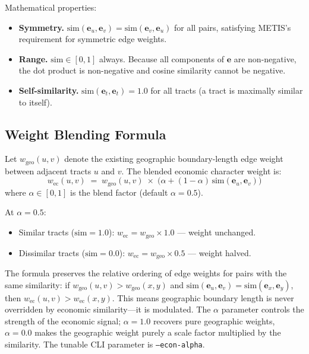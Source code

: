 Mathematical properties:
\begin{itemize}
  \item \textbf{Symmetry.} $\mathrm{sim}(\mathbf{e}_u, \mathbf{e}_v)
    = \mathrm{sim}(\mathbf{e}_v, \mathbf{e}_u)$ for all pairs,
    satisfying METIS's requirement for symmetric edge weights.
  \item \textbf{Range.} $\mathrm{sim} \in [0, 1]$ always.
    Because all components of $\mathbf{e}$ are non-negative,
    the dot product is non-negative and cosine similarity cannot be negative.
  \item \textbf{Self-similarity.}
    $\mathrm{sim}(\mathbf{e}_t, \mathbf{e}_t) = 1.0$ for all tracts
    (a tract is maximally similar to itself).
\end{itemize}

\subsection{Weight Blending Formula}

Let $w_{\mathrm{geo}}(u, v)$ denote the existing geographic boundary-length
edge weight between adjacent tracts $u$ and $v$.
The blended economic character weight is:
\begin{equation}
  w_{\mathrm{ec}}(u, v)
  \;=\;
  w_{\mathrm{geo}}(u, v)
  \;\times\;
  \bigl(\alpha + (1 - \alpha)\,\mathrm{sim}(\mathbf{e}_u, \mathbf{e}_v)\bigr)
  \label{eq:blend}
\end{equation}
where $\alpha \in [0, 1]$ is the blend factor (default $\alpha = 0.5$).

At $\alpha = 0.5$:
\begin{itemize}
  \item Similar tracts ($\mathrm{sim} = 1.0$):
    $w_{\mathrm{ec}} = w_{\mathrm{geo}} \times 1.0$ --- weight unchanged.
  \item Dissimilar tracts ($\mathrm{sim} = 0.0$):
    $w_{\mathrm{ec}} = w_{\mathrm{geo}} \times 0.5$ --- weight halved.
\end{itemize}
The formula preserves the relative ordering of edge weights for pairs with
the same similarity: if $w_{\mathrm{geo}}(u,v) > w_{\mathrm{geo}}(x,y)$
and $\mathrm{sim}(\mathbf{e}_u, \mathbf{e}_v) = \mathrm{sim}(\mathbf{e}_x, \mathbf{e}_y)$,
then $w_{\mathrm{ec}}(u,v) > w_{\mathrm{ec}}(x,y)$.
This means geographic boundary length is never overridden by economic
similarity---it is modulated.
The $\alpha$ parameter controls the strength of the economic signal;
$\alpha = 1.0$ recovers pure geographic weights, $\alpha = 0.0$ makes
the geographic weight purely a scale factor multiplied by the similarity.
The tunable CLI parameter is \texttt{--econ-alpha}.

